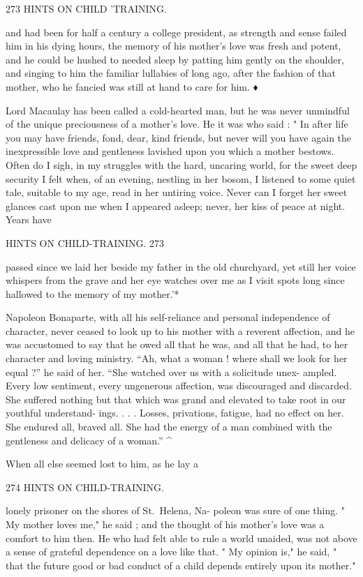 \documentclass[
]{book}
\begin{document}
273 HINTS ON CHILD 'TRAINING.

and had been for half a century a college president, as strength and sense failed him in his dying hours, the memory of his mother's love was fresh and potent, and he could be hushed to needed sleep by patting him gently on the shoulder, and singing to him the familiar lullabies of long ago, after the fashion of that mother, who he fancied was still at hand to care for him. ♦

Lord Macaulay has been called a cold-hearted man, but he was never unmindful of the unique preciousness of a mother's love. He it was who said : " In after life you may have friends, fond, dear, kind friends, but never will you have again the inexpressible love and gentleness lavished upon you which a mother bestows. Often do I sigh, in my struggles with the hard, uncaring world, for the sweet deep security I felt when, of an evening, nestling in her bosom, I listened to some quiet tale, suitable to my age, read in her untiring voice. Never can I forget her sweet glances cast upon me when I appeared asleep; never, her kiss of peace at night. Years have

HINTS ON CHILD-TRAINING. 273

passed since we laid her beside my father in the old churchyard, yet still her voice whispers from the grave and her eye watches over me as I visit spots long since hallowed to the memory of my mother.'*

Napoleon Bonaparte, with all his self-reliance and personal independence of character, never ceased to look up to his mother with a reverent affection, and he was accustomed to say that he owed all that he was, and all that he had, to her character and loving ministry. ``Ah, what a woman ! where shall we look for her equal ?'' he said of her. ``She watched over us with a solicitude unex- ampled. Every low sentiment, every ungenerous affection, was discouraged and discarded. She suffered nothing but that which was grand and elevated to take root in our youthful understand- ings. . . . Losses, privations, fatigue, had no effect on her. She endured all, braved all. She had the energy of a man combined with the gentleness and delicacy of a woman.'' \^{}

When all else seemed lost to him, as he lay a

274 HINTS ON CHILD-TRAINING.

lonely prisoner on the shores of St.~Helena, Na- poleon was sure of one thing. " My mother loves me," he said ; and the thought of his mother's love was a comfort to him then. He who had felt able to rule a world unaided, was not above a sense of grateful dependence on a love like that. " My opinion is," he said, " that the future good or bad conduct of a child depends entirely upon its mother."
\end{document}
